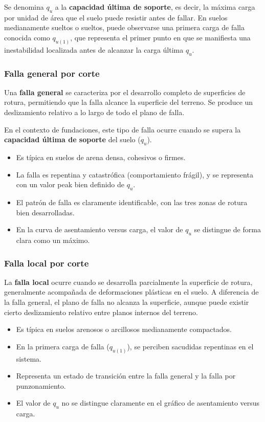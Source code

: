 \documentclass{article} %
\begin{document}
Se denomina $q_u$ a la \textbf{capacidad última de soporte}, es decir, la máxima carga por unidad de área que el suelo puede resistir antes de fallar.  
En suelos medianamente sueltos o sueltos, puede observarse una primera carga de falla conocida como $q_{u(1)}$, que representa el primer punto en que se manifiesta una inestabilidad localizada antes de alcanzar la carga última $q_u$.


\subsubsection*{Falla general por corte}

Una \textbf{falla general} se caracteriza por el desarrollo completo de superficies de rotura, permitiendo que la falla alcance la superficie del terreno. Se produce un deslizamiento relativo a lo largo de todo el plano de falla.

En el contexto de fundaciones, este tipo de falla ocurre cuando se supera la \textbf{capacidad última de soporte} del suelo ($q_u$).

\begin{itemize}
    \item Es típica en suelos de arena densa, cohesivos o firmes.
    \item La falla es repentina y catastrófica (comportamiento frágil), y se representa con un valor peak bien definido de $q_u$.
    \item El patrón de falla es claramente identificable, con las tres zonas de rotura bien desarrolladas.
    \item En la curva de asentamiento versus carga, el valor de $q_u$ se distingue de forma clara como un máximo.
\end{itemize}

\subsubsection*{Falla local por corte}

La \textbf{falla local} ocurre cuando se desarrolla parcialmente la superficie de rotura, generalmente acompañada de deformaciones plásticas en el suelo. A diferencia de la falla general, el plano de falla no alcanza la superficie, aunque puede existir cierto deslizamiento relativo entre planos internos del terreno.

\begin{itemize}
    \item Es típica en suelos arenosos o arcillosos medianamente compactados.
    \item En la primera carga de falla ($q_{u(1)}$), se perciben sacudidas repentinas en el sistema.
    \item Representa un estado de transición entre la falla general y la falla por punzonamiento.
    \item El valor de $q_u$ no se distingue claramente en el gráfico de asentamiento versus carga.
\end{itemize}
\end{document}
